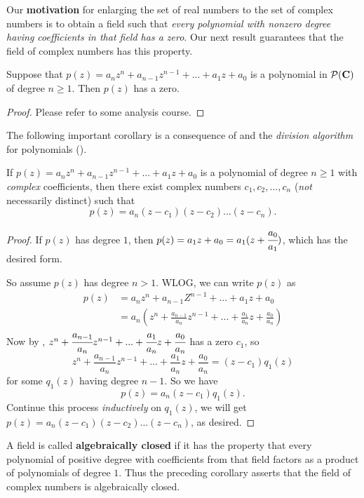 Our \textbf{motivation} for enlarging the set of real numbers to the set of complex numbers is to obtain a field such that
\emph{every polynomial with nonzero degree having coefficients in that field has a zero}.
Our next result guarantees that the field of complex numbers has this property.

\begin{appendix theorem}  \label{thm d.4}
Suppose that \(p(z) = a_n z^n + a_{n-1} z^{n-1} + ... + a_1 z + a_0\) is a polynomial in \(\mathcal{P}(\mathbf{C})\) of
degree \(n \ge 1\).
Then \(p(z)\) has a zero.
\end{appendix theorem}

\begin{proof}
Please refer to some analysis course.
\end{proof}

The following important corollary is a consequence of  and the \emph{division algorithm} for polynomials ().

\begin{appendix corollary} \label{corollary d.4.1}
If \(p(z) = a_n z^n + a_{n-1}z^{n - 1} + ... + a_1 z + a_0\) is a polynomial of degree \(n \ge 1\) with \emph{complex} coefficients, then there exist complex numbers \(c_1, c_2, ..., c_n\) (\emph{not} necessarily distinct) such that
\[
    p(z) = a_n(z - c_1)(z - c_2) ... (z - c_n).
\]
\end{appendix corollary}

\begin{proof}
If \(p(z)\) has degree \(1\), then \(p(z) = a_1 z + a_0 = a_1(z + \cfrac{a_0}{a_1})\), which has the desired form.

So assume \(p(z)\) has degree \(n > 1\).
WLOG, we can write \(p(z)\) as
\begin{align*}
    p(z) & = a_n z^n + a_{n-1}Z^{n - 1} + ... + a_1 z + a_0 \\
         & = a_n \left( z^n + \frac{a_{n-1}}{a_n} z^{n - 1} + ... + \frac{a_1}{a_n} z + \frac{a_0}{a_n} \right)
\end{align*}
Now by , \(z^n + \cfrac{a_{n-1}}{a_n} z^{n - 1} + ... + \cfrac{a_1}{a_n} z + \cfrac{a_0}{a_n}\) has a zero \(c_1\), so
\[
    z^n + \frac{a_{n-1}}{a_n} z^{n - 1} + ... + \frac{a_1}{a_n} z + \frac{a_0}{a_n} = (z - c_1)q_1(z)
\]
for some \(q_1(z)\) having degree \(n - 1\).
So we have
\[
    p(z) = a_n (z - c_1) q_1(z).
\]
Continue this process \emph{inductively} on \(q_1(z)\), we will get \(p(z) = a_n(z - c_1)(z - c_2) ... (z - c_n)\), as desired.
\end{proof}

\begin{remark} \label{remark d.8}
A field is called \textbf{algebraically closed} if it has the property that every polynomial of positive degree with coefficients from that field factors as a product of polynomials of degree \(1\).
Thus the preceding corollary asserts that the field of complex numbers is algebraically closed.
\end{remark}

